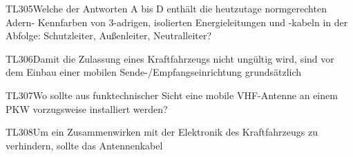 \begin{question}{TL305}{Welche der Antworten A bis D enthält die heutzutage normgerechten Adern- Kennfarben von 3-adrigen, isolierten Energieleitungen und -kabeln in der Abfolge: Schutzleiter, Außenleiter, Neutralleiter?}
\end{question}

\begin{question}{TL306}{Damit die Zulassung eines Kraftfahrzeugs nicht ungültig wird, sind vor dem Einbau einer mobilen Sende-/Empfangseinrichtung grundsätzlich}
\end{question}

\begin{question}{TL307}{Wo sollte aus funktechnischer Sicht eine mobile VHF-Antenne an einem PKW vorzugsweise installiert werden?}
\end{question}

\begin{question}{TL308}{Um ein Zusammenwirken mit der Elektronik des Kraftfahrzeugs zu verhindern, sollte das Antennenkabel}
\end{question}

